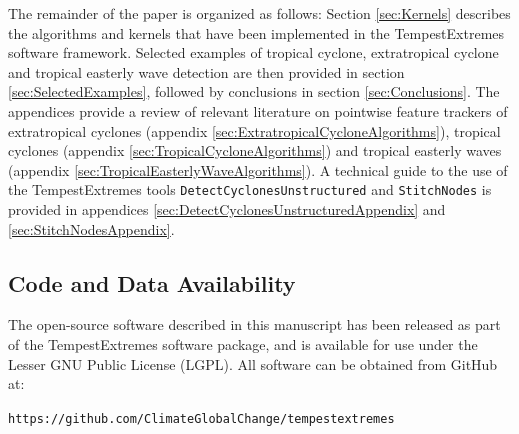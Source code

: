 \documentclass[gmdd, hvmath, online]{copernicus_discussions}
\begin{document}
The remainder of the paper is organized as follows:  Section \ref{sec:Kernels} describes the algorithms and kernels that have been implemented in the TempestExtremes software framework.  Selected examples of tropical cyclone, extratropical cyclone and tropical easterly wave detection are then provided in section \ref{sec:SelectedExamples}, followed by conclusions in section \ref{sec:Conclusions}.  The appendices provide a review of relevant literature on pointwise feature trackers of extratropical cyclones (appendix \ref{sec:ExtratropicalCycloneAlgorithms}), tropical cyclones (appendix \ref{sec:TropicalCycloneAlgorithms}) and tropical easterly waves (appendix \ref{sec:TropicalEasterlyWaveAlgorithms}).  A technical guide to the use of the TempestExtremes tools \texttt{DetectCyclonesUnstructured} and \texttt{StitchNodes} is provided in appendices \ref{sec:DetectCyclonesUnstructuredAppendix} and \ref{sec:StitchNodesAppendix}.

\subsection{Code and Data Availability}

The open-source software described in this manuscript has been released as part of the TempestExtremes software package, and is available for use under the Lesser GNU Public License (LGPL).  All software can be obtained from GitHub at:
\begin{center}
\texttt{https://github.com/ClimateGlobalChange/tempestextremes}
\end{center} 





\end{document}

